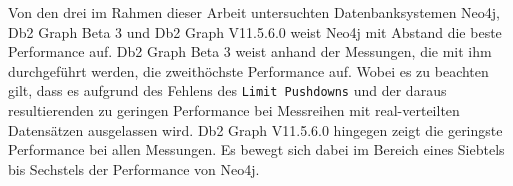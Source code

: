 Von den drei im Rahmen dieser Arbeit untersuchten Datenbanksystemen Neo4j, Db2 Graph Beta 3 und Db2 Graph V11.5.6.0 weist Neo4j mit Abstand die beste Performance auf. Db2 Graph Beta 3 weist anhand der Messungen, die mit ihm durchgeführt werden, die zweithöchste Performance auf. Wobei es zu beachten gilt, dass es aufgrund des Fehlens des \texttt{Limit Pushdowns} und der daraus resultierenden zu geringen Performance bei Messreihen mit real-verteilten Datensätzen ausgelassen wird. Db2 Graph V11.5.6.0 hingegen zeigt die geringste Performance bei allen Messungen. Es bewegt sich dabei im Bereich eines Siebtels bis Sechstels der Performance von Neo4j.


\listoftodos
